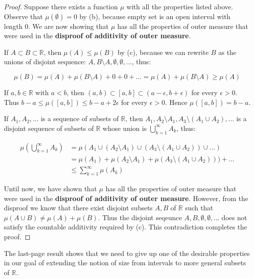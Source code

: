 \documentclass[reqno]{amsart}
\theoremstyle{definition}
\begin{document}
\begin{proof}

Suppose there exists a function $\mu$ with all the properties listed above. Observe that $\mu(\emptyset) = 0$ by (b), because empty set is an open interval with length $0$. We are now showing that $\mu$ has all the properties of outer measure that were used in the \textbf{disproof of additivity of outer measure}.

If $A \subset B \subset \mathbb{R}$, then $\mu(A) \leq \mu(B)$ by (c), because we can rewrite $B$ as the unions of disjoint sequence: $A, B \setminus A, \emptyset, \emptyset,...$, thus:

$$
\mu(B) = \mu(A) + \mu(B \setminus A) + 0 + 0 + ... = \mu(A) + \mu(B \setminus A) \geq \mu(A)
$$

If $a, b \in \mathbb{R}$ with $a < b$, then $(a, b) \subset [a, b] \subset (a-\epsilon, b+\epsilon)$ for every $\epsilon > 0$. Thus $b-a \leq \mu([a, b]) \leq b-a+2\epsilon$ for every $\epsilon > 0$. Hence $\mu([a, b]) = b-a$.

If $A_{1}, A_{2}, ...$ is a sequence of subsets of $\mathbb{R}$, then $A_{1}, A_{2}\setminus A_{1}, A_{3}\setminus (A_{1} \cup A_{2}), ...$ is a disjoint sequence of subsets of $\mathbb{R}$ whose union is $\bigcup\limits^{\infty}_{k=1}A_{k}$, thus:

\begin{align*}
\mu\left(\bigcup\limits^{\infty}_{k=1}A_{k}\right) &= \mu(A_{1} \cup (A_{2}\setminus A_{1}) \cup (A_{3}\setminus (A_{1} \cup A_{2})) \cup ...)\\
&= \mu(A_{1}) + \mu(A_{2}\setminus A_{1}) + \mu(A_{3}\setminus (A_{1} \cup A_{2}))) + ...\\
&\leq \sum\limits^{\infty}_{k=1}\mu(A_{k})
\end{align*}

Until now, we have shown that $\mu$ has all the properties of outer measure that were used in the \textbf{disproof of additivity of outer measure}. However, from the disproof we know that there exist disjoint subsets $A, B$ of $\mathbb{R}$ such that $\mu(A \cup B) \neq \mu(A) + \mu(B)$. Thus the disjoint seqeunce $A, B, \emptyset, \emptyset, ...$ does not satisfy the countable additivity required by (c). This contradiction completes the proof.
\end{proof}
\newpage
The last-page result shows that we need to give up one of the desirable properties in our goal of extending the notion of size from intervals to more general subsets of $\mathbb{R}$. 
\end{document}
